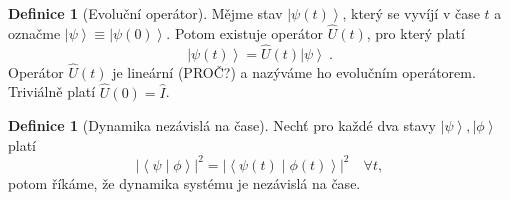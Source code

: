 \documentclass[10pt,a4paper]{report}
\theoremstyle{definition}
\newtheorem{definition}[theorem]{Definice}
\newcommand{\abs}[1]{\left| #1 \right|}
\newcommand{\ket}[1]{\left| #1 \right>}
\newcommand{\braket}[2]{\left< #1 \middle| #2 \right>}
\def\1{\hat{I}}
\begin{document}
\begin{definition}[Evoluční operátor]
    Mějme stav $\ket{\psi(t)}$, který se vyvíjí v čase $t$ a označme $\ket{\psi} \equiv \ket{\psi(0)}$. Potom existuje operátor $\hat{U}(t)$, pro který platí $$\ket{\psi(t)} = \hat{U}(t) \ket{\psi} \: .$$ Operátor $\hat{U}(t)$ je lineární (PROČ?) a nazýváme ho evolučním operátorem. Triviálně platí $\hat{U}(0) = \1$.
\end{definition}

\begin{definition}[Dynamika nezávislá na čase]
    Nechť pro každé dva stavy $\ket{\psi}, \ket{\phi}$ platí $$\abs{\braket{\psi}{\phi}}^2 = \abs{\braket{\psi(t)}{\phi(t)}}^2 \quad \forall t,$$ potom říkáme, že dynamika systému je nezávislá na čase.
\end{definition}
\end{document}
